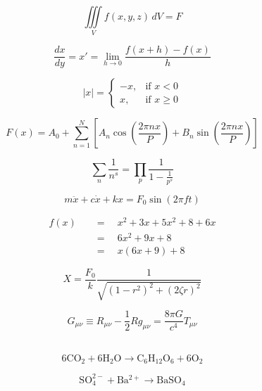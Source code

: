 \documentclass[]{article}
\begin{document}
\begin{equation*}
\iiint\limits_V f(x,y,z)\,dV = F
\end{equation*}


\begin{equation*}
\frac{dx}{dy}=x'=\lim_{h \to 0}\frac{f(x+h)-f(x)}{h}
\end{equation*}


\begin{equation*}
|x|=\begin{cases}
-x, & \text{if $x < 0$}\\
x, & \text{if $x \geq 0$} 
\end{cases}
\end{equation*}


\begin{equation*}
F(x)= A_0 + \sum_{n=1}^N\left[ A_n\cos{\left(\frac{2\pi nx}{P}\right)}+B_n\sin{\left(\frac{2\pi nx}{P}\right)}\right]
\end{equation*}


\begin{equation*}
\sum_n \frac{1}{n^s}=\prod_p \frac{1}{1-\frac{1}{p^s}}
\end{equation*}


\begin{equation*}         %
m\ddot{x}+c\dot{x}+kx=F_0\sin(2\pi ft)
\end{equation*}

\vspace{-0.15in} %
\begin{align*}
f(x)\quad &=\quad x^2 + 3x + 5x^2 +8 +6x\\
&=\quad 6x^2 +9x +8\\
&=\quad x(6x+9)+8
\end{align*}

$$
X=\frac{F_0}{k}\frac{1}{\sqrt{(1-r^2)^2+(2\zeta r)^2}}
$$

\begin{equation*}
G_{\mu\nu} \equiv R_{\mu\nu}-\frac{1}{2}Rg_{\mu\nu}=\frac{8\pi G}{c^4}T_{\mu\nu}
\end{equation*}\\

\vspace{-0.15in}

$$\mathrm{6CO_2+6H_2O \to C_6H_{12}O_6+6O_2}$$

$$\mathrm{SO_4^{2-}+Ba^{2+} \to BaSO_4 }$$
\end{document}
